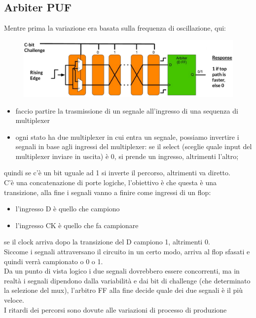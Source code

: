 \documentclass[oneside, 12pt]{extbook}
\begin{document}
\subsection{Arbiter PUF}
Mentre prima la variazione era basata sulla frequenza di oscillazione, qui:
\begin{figure}[!h]
	\includegraphics[scale=0.4]{immagini/hardware/arb_pug.png}
\end{figure}
\begin{itemize}
	\item faccio partire la trasmissione di un segnale all'ingresso di una sequenza di multiplexer
	\item ogni stato ha due multiplexer in cui entra un segnale, possiamo invertire i segnali in base agli ingressi del multiplexer: se il select (sceglie quale input del multiplexer inviare in uscita) è 0, si prende un ingresso, altrimenti l'altro;
\end{itemize}
quindi se c'è un bit uguale ad 1 si inverte il percorso, altrimenti va diretto.
\\C'è una concatenazione di porte logiche, l'obiettivo è che questa è una transizione, alla fine i segnali vanno a finire come ingressi di un flop:
\begin{itemize}
	\item l'ingresso D è quello che campiono
	\item l'ingresso CK è quello che fa campionare
\end{itemize}
se il clock arriva dopo la transizione del D campiono 1, altrimenti 0.
\\Siccome i segnali attraversano il circuito in un certo modo, arriva al flop sfasati e quindi verrà campionato o 0 o 1.
\\Da un punto di vista logico i due segnali dovrebbero essere concorrenti, ma in realtà i segnali dipendono dalla variabilità e dai bit di challenge (che determinato la selezione del mux), l'arbitro FF alla fine decide quale dei due segnali è il più veloce.
\\I ritardi dei percorsi sono dovute alle variazioni di processo di produzione
\end{document}
